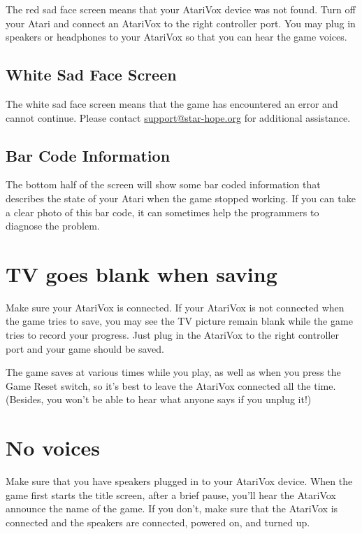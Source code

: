 \documentclass[10pt,twoside,openright]{memoir}
\begin{document}
The red sad  face screen means that your AtariVox  device was not found. 
Turn off your Atari and connect an AtariVox to the right controller port. 
You may plug in speakers or headphones to your AtariVox so that you can hear
the game voices.

\subsection{White Sad Face Screen}

The white sad  face screen means that the game  has encountered an error and
cannot continue.  Please contact
\href{mailto:support@star-hope.org}{support@star-hope.org} for additional
assistance.

\subsection{Bar Code Information}

The bottom half of the screen will show some bar coded information
that describes the state of your Atari when the game stopped
working. If you can take a clear photo of this bar code, it can
sometimes help the programmers to diagnose the problem.

\section{TV goes blank when saving}

Make sure your AtariVox is connected. If your AtariVox is not
connected when the game tries to save, you may see the TV picture
remain blank while the game tries to record your progress. Just plug
in the AtariVox to the right controller port and your game should be
saved.

The game saves at various times while you play, as well as when you
press the Game Reset switch, so it's best to leave the AtariVox
connected all the time. (Besides, you won't be able to hear what
anyone says if you unplug it!)

\section{No voices}

Make sure that you have speakers plugged in to your AtariVox
device. When the game first starts the title screen, after a brief
pause, you'll hear the AtariVox announce the name of the game. If you
don't, make sure that the AtariVox is connected and the speakers are
connected, powered on, and turned up.
\end{document}
